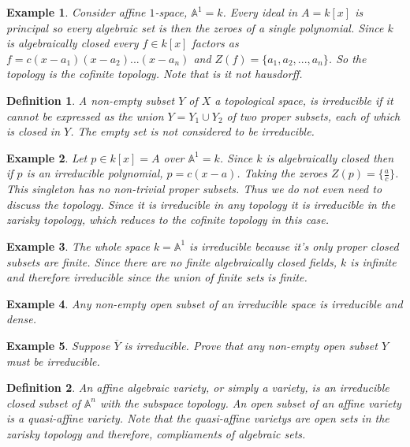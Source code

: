 \documentclass{article}
\theoremstyle{problemstyle}
\newtheorem{example}{Example}
\newtheorem{definition}{Definition}
\begin{document}
\begin{example}
Consider affine $1$-space, $\mathbb{A}^1 = k$. Every ideal in $A = k[x]$ is principal so every algebraic set is then the zeroes of a single polynomial. Since $k$ is algebraically closed every $f \in k[x]$ factors as $f = c(x-a_1)(x-a_2)...(x-a_n)$ and $Z(f) = \{a_1,a_2,...,a_n\}$. So the topology is the cofinite topology. Note that is it not hausdorff. 
\end{example}

\begin{definition}
A non-empty subset $Y$ of $X$ a topological space, is irreducible if it cannot be expressed as the union $Y = Y_1 \cup Y_2$ of two proper subsets, each of which is closed in $Y$. The empty set is not considered to be irreducible.  
\end{definition}

\begin{example}
Let $p \in k[x] = A$ over $\mathbb{A}^1 = k$. Since $k$ is algebraically closed then if $p$ is an irreducible polynomial, $p = c(x-a)$. Taking the zeroes $Z(p) = \{\frac{a}{c}\}$. This singleton has no non-trivial proper subsets. Thus we do not even need to discuss the topology.  Since it is irreducible in any topology it is irreducible in the zarisky topology, which reduces to the cofinite topology in this case. 
\end{example}

\begin{example}
The whole space $k = \mathbb{A}^1$ is irreducible because it's only proper closed subsets are finite. Since there are no finite algebraically closed fields, $k$ is infinite and therefore irreducible since the union of finite sets is finite.  
\end{example}

\begin{example}
Any non-empty open subset of an irreducible space is irreducible and dense. 
\end{example}

\begin{example}
Suppose $\overline{Y}$ is irreducible. Prove that any non-empty open subset $Y$ must be irreducible.  
\end{example}

\begin{definition}
An affine algebraic variety, or simply a variety, is an irreducible closed subset of $\mathbb{A}^n$ with the subspace topology. An open subset of an affine variety is a quasi-affine variety. Note that the quasi-affine varietys are open sets in the zarisky topology and therefore, compliaments of algebraic sets. 
\end{definition}
\end{document}
